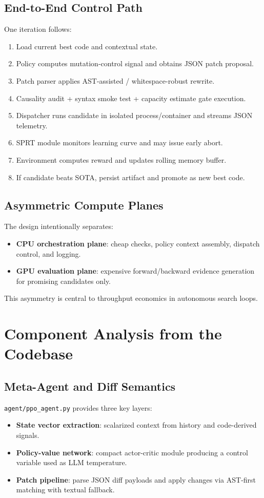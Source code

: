 \documentclass[11pt]{article}
\begin{document}
\subsection{End-to-End Control Path}
One iteration follows:
\begin{enumerate}[leftmargin=1.5em]
    \item Load current best code and contextual state.
    \item Policy computes mutation-control signal and obtains JSON patch proposal.
    \item Patch parser applies AST-assisted / whitespace-robust rewrite.
    \item Causality audit + syntax smoke test + capacity estimate gate execution.
    \item Dispatcher runs candidate in isolated process/container and streams JSON telemetry.
    \item SPRT module monitors learning curve and may issue early abort.
    \item Environment computes reward and updates rolling memory buffer.
    \item If candidate beats SOTA, persist artifact and promote as new best code.
\end{enumerate}

\subsection{Asymmetric Compute Planes}
The design intentionally separates:
\begin{itemize}[leftmargin=1.5em]
    \item \textbf{CPU orchestration plane}: cheap checks, policy context assembly, dispatch control, and logging.
    \item \textbf{GPU evaluation plane}: expensive forward/backward evidence generation for promising candidates only.
\end{itemize}
This asymmetry is central to throughput economics in autonomous search loops.

\section{Component Analysis from the Codebase}
\subsection{Meta-Agent and Diff Semantics}
\texttt{agent/ppo\_agent.py} provides three key layers:
\begin{itemize}[leftmargin=1.5em]
    \item \textbf{State vector extraction}: scalarized context from history and code-derived signals.
    \item \textbf{Policy-value network}: compact actor-critic module producing a control variable used as LLM temperature.
    \item \textbf{Patch pipeline}: parse JSON diff payloads and apply changes via AST-first matching with textual fallback.
\end{itemize}
\end{document}
